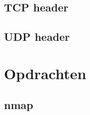 \documentclass[a4paper,12pt,twoside,openright,titlepage]{book}
\begin{document}
\section{TCP header}

\section{UDP header}


\chapter{Opdrachten}
\section{nmap}


\printindex
\end{document}
